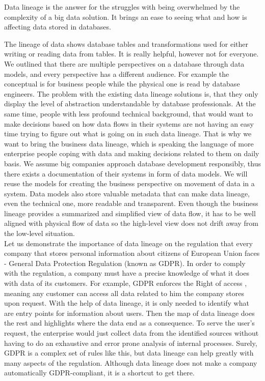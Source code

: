 Data lineage is the answer for the struggles with being overwhelmed by the complexity of a big data solution. It brings an ease to seeing what and how is affecting data stored in databases.

The lineage of data shows database tables and transformations used for either writing or reading data from tables.  It is really helpful, however not for everyone. 
We outlined that there are multiple perspectives on a database through data models, and every perspective has a different audience. For example the conceptual is for business people while the physical one is read by database engineers.
The problem with the existing data lineage solutions is, that they only display the level of abstraction understandable by database professionals. 
At the same time, people with less profound technical background, that would want to make decisions based on how data flows in their systems are not having an easy time trying to figure out what is going on in such data lineage.
That is why we want to bring the business data lineage, which is speaking the language of more enterprise people coping with data and making decisions related to them on daily basis. We assume big companies approach database development responsibly, thus there exists a documentation of their systems in form of data models. 
We will reuse the models for creating the business perspective on movement of data in a system. 
Data models also store valuable metadata that can make data lineage, even the technical one, more readable and transparent.
Even though the business lineage provides a summarized and simplified view of data flow, it has to be well aligned with physical flow of data so the high-level view does not drift away from the low-level situation.\\

Let us demonstrate the importance of data lineage on the regulation that every company that stores personal information about citizens of European Union faces - General Data Protection Regulation (known as GDPR).
In order to comply with the regulation, a company must have a precise knowledge of what it does with data of its customers.  
For example, GDPR enforces the Right of access \cite{RightOfAccess}, meaning any customer can access all data related to him the company stores upon request. With the help of data lineage, it is only needed to identify what are entry points for information about users. Then the map of data lineage does the rest and highlights where the data end as a consequence. To serve the user's request, the enterprise would just collect data from the identified sources without having to do an exhaustive and error prone analysis of internal processes.
Surely, GDPR is a complex set of rules like this, but data lineage can help greatly with many aspects of the regulation. Although data lineage does not make a company automatically GDPR-compliant, it is a shortcut to get there. 

